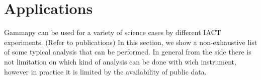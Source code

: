 \section{Applications}
\label{sec:applications}

Gammapy can be used for a variety of science cases by different IACT experiments. (Refer to publications)
In this section, we show a non-exhaustive list of some typical analysis that can be performed.
In general from the \gammapy side there is not limitation on which kind of analysis can be
done with wich instrument, however in practice it is limited by the availability of public data.








